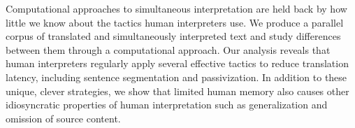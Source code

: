 Computational approaches to simultaneous interpretation are held back by how little we know about the tactics human interpreters use. We produce a parallel corpus of translated and simultaneously interpreted text and study differences between them through a computational approach. Our analysis reveals that human interpreters regularly apply several effective tactics to reduce translation latency, including sentence segmentation and passivization. In addition to these unique, clever strategies, we show that limited human memory also causes other idiosyncratic properties of human interpretation such as generalization and omission of source content.
